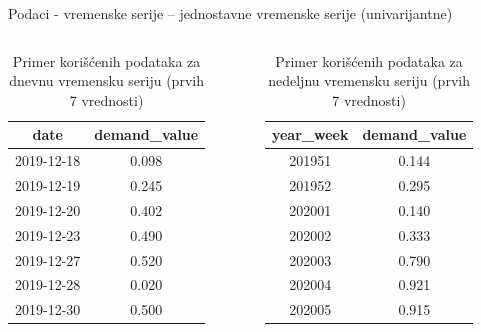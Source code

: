 \documentclass{beamer}
\begin{document}
\begin{frame}{Podaci - vremenske serije}
-- jednostavne vremenske serije (univarijantne)
\vspace{-10px}

\begin{columns}
\begin{column}{0.5\textwidth}
\begin{table}
\centering
\caption{Primer korišćenih podataka za dnevnu vremensku seriju (prvih 7 vrednosti)}
\label{tbl: daily_data_example}
\begin{tabular}{ |c|c|} 
\hline
date & demand\_value \\
\hline
2019-12-18 & 0.098\\
2019-12-19 & 0.245\\
2019-12-20 & 0.402\\
2019-12-23 & 0.490\\
2019-12-27 & 0.520\\
2019-12-28 & 0.020\\
2019-12-30 & 0.500\\
\hline
\end{tabular}
\end{table}
\end{column}

\begin{column}{0.5\textwidth}
\begin{table}
\centering
\caption{Primer korišćenih podataka za nedeljnu vremensku seriju (prvih 7 vrednosti)}
\label{tbl: weekly_data_example}
\begin{tabular}{ |c|c|} 
\hline
year\_week & demand\_value \\
\hline
201951 & 0.144\\
201952 & 0.295\\
202001 & 0.140\\
202002 & 0.333\\
202003 & 0.790\\
202004 & 0.921\\
202005 & 0.915\\
\hline
\end{tabular}
\end{table}
\end{column}
\end{columns}

\end{frame}
\end{document}
